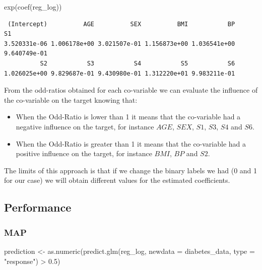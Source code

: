\documentclass[
]{article}
\newenvironment{Shaded}{\begin{snugshade}}{\end{snugshade}}
\newcommand{\AttributeTok}[1]{\textcolor[rgb]{0.77,0.63,0.00}{#1}}
\newcommand{\FloatTok}[1]{\textcolor[rgb]{0.00,0.00,0.81}{#1}}
\newcommand{\FunctionTok}[1]{\textcolor[rgb]{0.00,0.00,0.00}{#1}}
\newcommand{\NormalTok}[1]{#1}
\newcommand{\OtherTok}[1]{\textcolor[rgb]{0.56,0.35,0.01}{#1}}
\newcommand{\SpecialCharTok}[1]{\textcolor[rgb]{0.00,0.00,0.00}{#1}}
\newcommand{\StringTok}[1]{\textcolor[rgb]{0.31,0.60,0.02}{#1}}
\begin{document}
\begin{Shaded}
\begin{Highlighting}[]
\FunctionTok{exp}\NormalTok{(}\FunctionTok{coef}\NormalTok{(reg\_log))}
\end{Highlighting}
\end{Shaded}

\begin{verbatim}
 (Intercept)          AGE          SEX          BMI           BP           S1 
3.520331e-06 1.006178e+00 3.021507e-01 1.156873e+00 1.036541e+00 9.640749e-01 
          S2           S3           S4           S5           S6 
1.026025e+00 9.829687e-01 9.430980e-01 1.312220e+01 9.983211e-01 
\end{verbatim}

From the odd-ratios obtained for each co-variable we can evaluate the
influence of the co-variable on the target knowing that:

\begin{itemize}
\item
  When the Odd-Ratio is lower than 1 it means that the co-variable had a
  negative influence on the target, for instance \(AGE\), \(SEX\),
  \(S1\), \(S3\), \(S4\) and \(S6\).
\item
  When the Odd-Ratio is greater than 1 it means that the co-variable had
  a positive influence on the target, for instance \(BMI\), \(BP\) and
  \(S2\).
\end{itemize}

The limits of this approach is that if we change the binary labels we
had (0 and 1 for our case) we will obtain different values for the
estimated coefficients.

\hypertarget{performance}{%
\subsection{Performance}\label{performance}}

\hypertarget{map}{%
\subsubsection{MAP}\label{map}}

\begin{Shaded}
\begin{Highlighting}[]
\NormalTok{prediction }\OtherTok{\textless{}{-}} \FunctionTok{as.numeric}\NormalTok{(}\FunctionTok{predict.glm}\NormalTok{(reg\_log, }\AttributeTok{newdata =}\NormalTok{ diabetes\_data, }\AttributeTok{type =} \StringTok{"response"}\NormalTok{) }\SpecialCharTok{\textgreater{}} \FloatTok{0.5}\NormalTok{)}
\end{Highlighting}
\end{Shaded}
\end{document}
